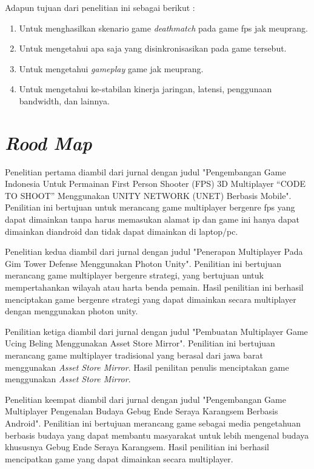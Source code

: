 Adapun tujuan dari penelitian ini sebagai berikut :
\begin{enumerate}
	\item Untuk menghasilkan skenario game \textit{deathmatch} pada game fps jak meuprang.
	\item Untuk mengetahui apa saja yang disinkronisasikan pada game tersebut.
	\item Untuk mengetahui \textit{gameplay} game jak meuprang.
	\item Untuk mengetahui ke-stabilan kinerja jaringan, latensi, penggunaan bandwidth, dan lainnya. 
\end{enumerate}

\section{\textit{Rood Map}}
\noindent

Penelitian pertama diambil dari jurnal dengan judul "Pengembangan Game Indonesia Untuk Permainan First Person Shooter (FPS) 3D Multiplayer “CODE TO SHOOT” Menggunakan UNITY NETWORK (UNET) Berbasis Mobile".
Penilitian ini bertujuan untuk merancang game multiplayer bergenre fps yang dapat dimainkan tanpa harus memasukan alamat ip dan game ini hanya dapat dimainkan diandroid dan tidak dapat dimainkan di laptop/pc.

Penelitian kedua diambil dari jurnal dengan judul "Penerapan Multiplayer Pada Gim Tower Defense Menggunakan Photon Unity". Penilitian ini bertujuan merancang game multiplayer bergenre strategi, yang bertujuan untuk mempertahankan wilayah atau harta benda pemain. Hasil penilitian ini berhasil menciptakan game bergenre strategi yang dapat dimainkan secara multiplayer dengan menggunakan photon unity.

Penilitian ketiga diambil dari jurnal dengan judul "Pembuatan Multiplayer Game Ucing Beling Menggunakan Asset 
Store Mirror". Penilitian ini bertujuan merancang game multiplayer tradisional yang berasal dari jawa barat menggunakan \textit{Asset Store Mirror}. Hasil penilitan penulis menciptakan game menggunakan \textit{Asset Store Mirror}.

Penelitian keempat diambil dari jurnal dengan judul "Pengembangan Game Multiplayer Pengenalan 
Budaya Gebug Ende Seraya Karangsem Berbasis 
Android". Penilitian ini bertujuan merancang game sebagai media pengetahuan berbasis budaya yang dapat membantu masyarakat untuk lebih mengenal budaya khususnya Gebug Ende Seraya Karangsem. Hasil penilitian ini berhasil mencipatkan game yang dapat dimainkan secara multiplayer.

